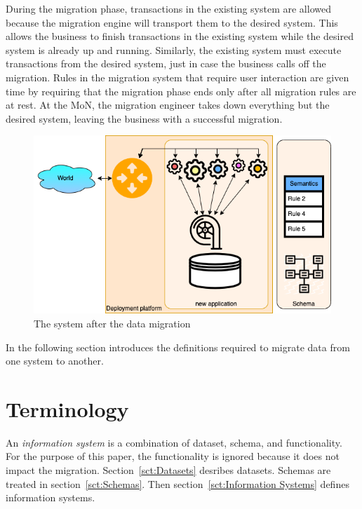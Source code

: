 \documentclass{elsarticle}
\begin{document}
   During the migration phase, transactions in the existing system are allowed because the migration engine will transport them to the desired system.
   This allows the business to finish transactions in the existing system while the desired system is already up and running.
   Similarly, the existing system must execute transactions from the desired system, just in case the business calls off the migration.
   Rules in the migration system that require user interaction are given time by requiring that the migration phase ends
   only after all migration rules are at rest.
   At the MoN, the migration engineer takes down everything but the desired system,
   leaving the business with a successful migration.
\begin{figure}[bht]
   \begin{center}
     \includegraphics[scale=.35]{datamigration-Post-migration.drawio.png}
   \end{center}
\caption{The system after the data migration}
\label{fig:post-migration}
\end{figure}

   In the following section introduces the definitions required to migrate data from one system to another.

\section{Terminology}
\label{sct:Terminology}
   An {\em information system} is a combination of dataset, schema, and functionality.
   For the purpose of this paper, the functionality is ignored because it does not impact the migration.
   Section~\ref{sct:Datasets} desribes datasets. Schemas are treated in section~\ref{sct:Schemas}.
   Then section~\ref{sct:Information Systems} defines information systems.
\end{document}
